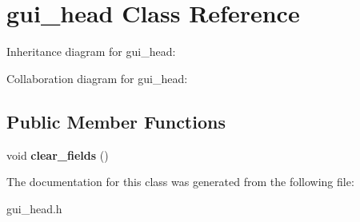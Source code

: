 \hypertarget{classgui__head}{}\section{gui\+\_\+head Class Reference}
\label{classgui__head}


Inheritance diagram for gui\+\_\+head\+:


Collaboration diagram for gui\+\_\+head\+:
\subsection*{Public Member Functions}
\begin{DoxyCompactItemize}
\item 
void {\bfseries clear\+\_\+fields} ()\hypertarget{classgui__head_a4e697fc5980dfa89a23f74c6a918dc63}{}\label{classgui__head_a4e697fc5980dfa89a23f74c6a918dc63}

\end{DoxyCompactItemize}


The documentation for this class was generated from the following file\+:\begin{DoxyCompactItemize}
\item 
gui\+\_\+head.\+h\end{DoxyCompactItemize}
